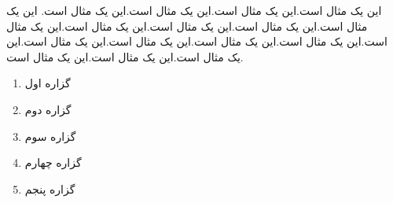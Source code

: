 \documentclass{book}
\makeatletter
\def\@myharfi#1{\ifcase#1\or الف\or ب\or پ\or ت\or ث\or
ج\or چ\or ح\or خ\or د\or ذ\or ر\or ز\or س\or ش\or ص\or ض\or ع\or غ\or
ف\or ق\or ک\or گ\or ل\or م\or ن\or و\or ه\or ی\else\@ctrerr\fi}
\def\myharfi#1{\expandafter\@myharfi\csname c@#1\endcsname}
\makeatother
\begin{document}
این یک مثال است.این یک مثال است.این یک مثال است.این یک مثال است. این یک مثال است.این یک مثال است.این یک مثال است.این یک مثال است.این یک مثال است.این یک مثال است.این یک مثال است.این یک مثال است.این یک مثال است.این یک مثال است.این یک مثال است.این یک مثال است.
\begin{enumerate}[label=\myharfi*),align=left]
	\item  گزاره اول
\item  گزاره دوم
	\item  گزاره سوم
	\item گزاره چهارم
	\item  گزاره پنجم
\end{enumerate}
\end{document}
